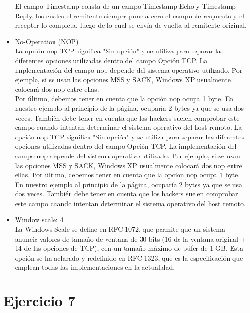 \documentclass[osajnl,twocolumn,showpacs,superscriptaddress,10pt]{revtex4-1} %
\begin{document}
\begin{itemize}
    El campo Timestamp consta de un campo Timestamp Echo y Timestamp Reply, los cuales el remitente siempre pone a cero el campo de 
    respuesta y el receptor lo completa, luego de lo cual se envía de vuelta al remitente original. \\

    \item No-Operation (NOP) \\

    La opción nop TCP significa "Sin opción" y se utiliza para separar las diferentes opciones utilizadas dentro del campo Opción TCP. 
    La implementación del campo nop depende del sistema operativo utilizado. Por ejemplo, si se usan las opciones MSS y SACK, 
    Windows XP usualmente colocará dos nop entre ellas. \\
    
    Por último, debemos tener en cuenta que la opción nop ocupa 1 byte. En nuestro ejemplo al principio de la página, ocuparía 
    2 bytes ya que se usa dos veces. También debe tener en cuenta que los hackers suelen comprobar este campo cuando intentan 
    determinar el sistema operativo del host remoto. La opción nop TCP significa "Sin opción" y se utiliza para separar las 
    diferentes opciones utilizadas dentro del campo Opción TCP. La implementación del campo nop depende del sistema operativo utilizado. 
    Por ejemplo, si se usan las opciones MSS y SACK, Windows XP usualmente colocará dos nop entre ellas. Por último, debemos tener en 
    cuenta que la opción nop ocupa 1 byte. En nuestro ejemplo al principio de la página, ocuparía 2 bytes ya que se usa dos veces. También 
    debe tener en cuenta que los hackers suelen comprobar este campo cuando intentan determinar el sistema operativo del host remoto. \\

    \item Window scale: 4 \\

    La Windows Scale se define en RFC 1072, que permite que un sistema anuncie valores de tamaño de ventana de 30 bits 
    (16 de la ventana original + 14 de las opciones de TCP), con un tamaño máximo de búfer de 1 GB. Esta opción se ha aclarado 
    y redefinido en RFC 1323, que es la especificación que emplean todas las implementaciones en la actualidad.
\end{itemize}

\section{Ejercicio 7}
\end{document}
